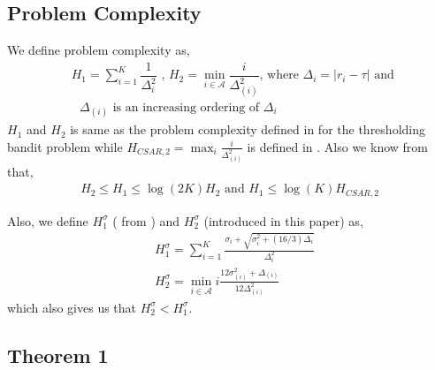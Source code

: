 \subsection{Problem Complexity}

We define problem complexity as,
\begin{align*}
& H_{1} = \sum_{i=1}^{K}\dfrac{1}{\Delta_{i}^{2}} \text{ ,   } H_{2}=\min_{i\in \mathcal{A}}\dfrac{i}{{\Delta_{(i)}^{2}}} \text{, where } \Delta_{i}=|r_{i}-\tau| \text{ and }\\
& \text{ $\Delta_{(i)}$ is an increasing ordering of $\Delta_i$ }
\end{align*}
$H_1$ and $H_2$ is same as the problem complexity defined in \cite{locatelli2016optimal} for the thresholding bandit problem while $H_{CSAR,2}=\max_{i}\frac{i}{\Delta_{(i)}^2}$ is defined in \cite{chen2014combinatorial}. Also we know from \cite{locatelli2016optimal} that,
\begin{align*}
H_{2}\leq H_{1}\leq \log(2K)H_{2} \text{ and } H_1 \leq \log(K)H_{CSAR,2}
\end{align*}

Also, we define $H_{1}^{\sigma}$ ( from \cite{gabillon2011multi}) and $H_{2}^{\sigma}$ (introduced in this paper) as,
\begin{align*}
& H_{1}^{\sigma}=\sum_{i=1}^{K}\frac{\sigma_{i}+\sqrt{\sigma_{i}^{2}+(16/3)\Delta_{i}}}{\Delta_{i}^{2}}\\
& H_{2}^{\sigma}=\min_{i\in \mathcal{A}} i\frac{12\sigma_{(i)}^{2} + \Delta_{(i)}}{12\Delta_{(i)}^{2}}
\end{align*}
which also gives us that $H_{2}^{\sigma} < H_{1}^{\sigma}$.


\subsection{Theorem 1}

